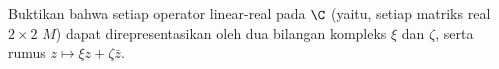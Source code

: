
\begin{exercise} \label{exercise:reallinmap}
Buktikan bahwa setiap operator linear-real pada $\C$ (yaitu, setiap matriks
real $2 \times 2$ $M$) dapat direpresentasikan oleh dua bilangan kompleks
$\xi$ dan $\zeta$, serta rumus
$z \mapsto \xi z + \zeta \bar{z}$.
\end{exercise}
